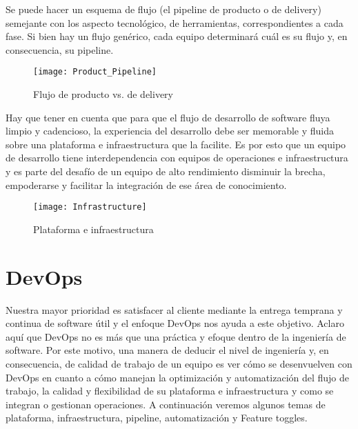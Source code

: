 Se puede hacer un esquema de flujo (el pipeline de producto o de delivery) semejante con los aspecto tecnológico, de herramientas, correspondientes a cada fase. Si bien hay un flujo genérico, cada equipo determinará cuál es su flujo y, en consecuencia, su pipeline.

\begin{figure}[h]
  \centering
  \texttt{[image: Product\_Pipeline]}
  \caption{Flujo de producto vs. de delivery}
  \centering
  \label{fig:Product_Pipeline} %
\end{figure}
\FloatBarrier %


Hay que tener en cuenta que para que el flujo de desarrollo de software fluya limpio y cadencioso, la experiencia del desarrollo debe ser memorable y fluida sobre una plataforma e infraestructura que la facilite. Es por esto que un equipo de desarrollo tiene interdependencia con equipos de operaciones e infraestructura y es parte del desafío de un equipo de alto rendimiento disminuir la brecha, empoderarse y facilitar la integración de ese área de conocimiento.

\begin{figure}[h]
  \centering
  \texttt{[image: Infrastructure]}
  \caption{Plataforma e infraestructura}
  \centering
  \label{fig:Infrastructure} %
\end{figure}
\FloatBarrier %


\section{DevOps}

Nuestra mayor prioridad es satisfacer al cliente mediante la entrega temprana y continua de software útil y el enfoque DevOps nos ayuda a este objetivo. Aclaro aquí que DevOps no es más que una práctica y efoque dentro de la ingeniería de software. Por este motivo, una manera de deducir el nivel de ingeniería y, en consecuencia, de calidad de trabajo de un equipo es ver cómo se desenvuelven con DevOps en cuanto a cómo manejan la optimización y automatización del flujo de trabajo, la calidad y flexibilidad de su plataforma e infraestructura y como se integran o gestionan operaciones. A continuación veremos algunos temas de plataforma, infraestructura, pipeline, automatización y Feature toggles.



